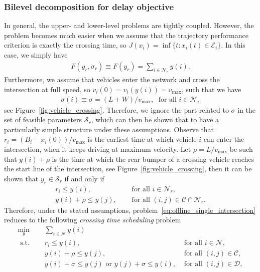 \documentclass{article}
\theoremstyle{definition}
\theoremstyle{plain}
\begin{document}
\subsubsection{Bilevel decomposition for delay objective}

In general, the upper- and lower-level problems are tightly coupled. However,
the problem becomes much easier when we assume that the trajectory performance
criterion is exactly the crossing time, so
$J(x_{i}) = \inf \{ t: x_{i}(t) \in \mathcal{E}_{i} \}$. In this case, we simply
have
\begin{align*}
  F(y_{r}, \sigma_{r}) \equiv F(y_{r}) = \sum_{i \in \mathcal{N}_{r}} y(i) .
\end{align*}
%
Furthermore, we assume that vehicles enter the network and cross the
intersection at full speed, so $v_{i}(0) = v_{i}(y(i)) = v_{\max}$, such that we
have
\begin{align*}
\sigma(i) \equiv \sigma = (L + W) / v_{\max}, \; \text{ for all } i \in \mathcal{N} ,
\end{align*}
see Figure~\ref{fig:vehicle_crossing}.
%
Therefore, we ignore the part related to $\sigma$ in the set of feasible parameters
$\mathcal{S}_{r}$, which can then be shown that to have a particularly simple
structure under these assumptions.
Observe that $r_{i} = (B_{i} - x_{i}(0)) / v_{\max}$ is the earliest time at
which vehicle $i$ can enter the intersection, when it keeps driving at maximum
velocity.
%
Let $\rho = L / v_{\max}$ be such that $y(i) + \rho$ is the time at which the rear
bumper of a crossing vehicle reaches the start line of the intersection, see
Figure~\ref{fig:vehicle_crossing}, then it can be shown that
$y_{r} \in \mathcal{S}_{r}$ if and only if
\begin{align*}
  r_{i} \leq y(i), \quad & \text{ for all } i \in \mathcal{N}_{r} , \\
  y(i) + \rho \leq y(j), \quad & \text{ for all } (i,j) \in \mathcal{C} \cap \mathcal{N}_{r} .
\end{align*}
Therefore, under the stated assumptions,
problem~\eqref{eq:offline_single_intersection} reduces to the following \textit{crossing time scheduling} problem
\begin{subequations}
  \label{eq:single_intersection_scheduling}
\begin{align}
  \min_{y} \quad & \sum_{i \in \mathcal{N}} y(i) \\
  \text{ s.t. } \quad & r_{i} \leq y(i) , & \text{ for all } i \in \mathcal{N} , \\
                    & y(i) + \rho \leq y(j) , & \text{ for all } (i,j) \in \mathcal{C} , \label{eq:conjunctions} \\
                    & y(i) + \sigma \leq y(j) \text{ or } y(j) + \sigma \leq y(i) , & \text{ for all } (i,j) \in \mathcal{D} \label{eq:disjunctions} ,
\end{align}
\end{subequations}
\end{document}
